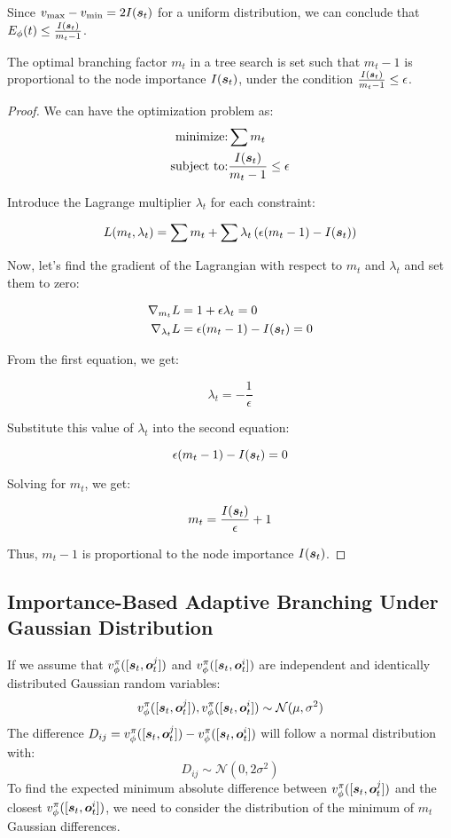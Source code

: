 Since $v_{\max} - v_{\min}=2I({\bm{s}}_t)$ for a uniform distribution, we can conclude that $E_\phi(t) \le \frac{I({\bm{s}}_t)}{m_t - 1}$.

\begin{theorem}
The optimal branching factor $m_t$ in a tree search is set such that $m_t - 1$ is proportional to the node importance $I({\bm{s}}_t)$, under the condition $\frac{I({\bm{s}}_t)}{m_t-1} \le \epsilon$.
\end{theorem}

\begin{proof}
We can have the optimization problem as:
\begin{align*}
\text{minimize:} & \sum m_t \\
\text{subject to:} & \frac{I({\bm{s}}_t)}{m_t-1} \le \epsilon
\end{align*}

Introduce the Lagrange multiplier $\lambda_t$ for each constraint:

$$
L(m_t, \lambda_t) = \sum m_t + \sum \lambda_t \left (\epsilon (m_t-1) - I({\bm{s}}_t)\right)
$$

Now, let's find the gradient of the Lagrangian with respect to $m_t$ and $\lambda_t$ and set them to zero:

\begin{align*}
\nabla_{m_t} L &= 1 + \epsilon \lambda_t = 0 \\
\nabla_{\lambda_t} L &= \epsilon (m_t-1) - I({\bm{s}}_t) = 0
\end{align*}

From the first equation, we get:

$$
\lambda_t = -\frac{1}{\epsilon}
$$

Substitute this value of $\lambda_t$ into the second equation:

$$
\epsilon (m_t-1) - I({\bm{s}}_t) = 0
$$

Solving for $m_t$, we get:

$$
m_t = \frac{I({\bm{s}}_t)}{\epsilon} + 1
$$

Thus, $m_t - 1$ is proportional to the node importance $I({\bm{s}}_t)$.
\end{proof}

\subsection{Importance-Based Adaptive Branching Under Gaussian Distribution}
\label{app:node_importance_gaussian} 

If we assume that \(v_{\phi}^{\pi}([{\bm{s}}_t, {\bm{o}}_t^{j}])\) and \(v_{\phi}^{\pi}([{\bm{s}}_t, {\bm{o}}_t^{i}])\) are independent and identically distributed Gaussian random variables:
\[
v_{\phi}^{\pi}([{\bm{s}}_t, {\bm{o}}_t^{j}]), v_{\phi}^{\pi}([{\bm{s}}_t, {\bm{o}}_t^{i}]) \sim \mathcal{N}(\mu, \sigma^2)
\]
The difference \(D_{ij} = v_{\phi}^{\pi}([{\bm{s}}_t, {\bm{o}}_t^{j}]) - v_{\phi}^{\pi}([{\bm{s}}_t, {\bm{o}}_t^{i}])\) will follow a normal distribution with:
\[
D_{ij} \sim \mathcal{N}(0, 2\sigma^2)
\]
To find the expected minimum absolute difference between \(v_{\phi}^{\pi}([{\bm{s}}_t, {\bm{o}}_t^{j}])\) and the closest \(v_{\phi}^{\pi}([{\bm{s}}_t, {\bm{o}}_t^{i}])\), we need to consider the distribution of the minimum of \(m_t\) Gaussian differences.


